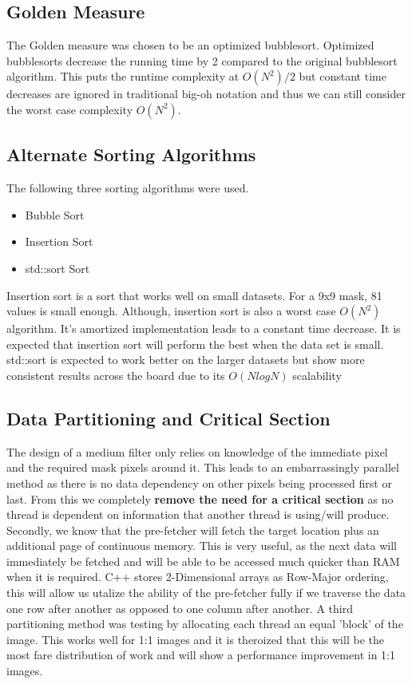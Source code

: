 \subsection{Golden Measure}
The Golden measure was chosen to be an optimized bubblesort. Optimized bubblesorts decrease the running time by 2 compared to the original bubblesort algorithm. This puts the runtime complexity at $O(N^2)/2$ but constant time decreases are ignored in traditional big-oh notation and thus we can still consider the worst case complexity $O(N^2)$.\\


\subsection{Alternate Sorting Algorithms}
The following three sorting algorithms were used.

\begin{itemize}
\item Bubble Sort
\item Insertion Sort
\item std::sort Sort
\end{itemize}

Insertion sort is a sort that works well on small datasets. For a 9x9 mask, 81 values is small enough. Although, insertion sort is also a worst case $O(N^2)$ algorithm. It's amortized implementation leads to a constant time decrease. It is expected that insertion sort will perform the best when the data set is small.\newline
std::sort is expected to work better on the larger datasets but show more consistent results across the board due to its $O(NlogN)$ scalability

\subsection{Data Partitioning and Critical Section}
The design of a medium filter only relies on knowledge of the immediate pixel and the required mask pixels around it. This leads to an embarrassingly parallel method as there is no data dependency on other pixels being processed first or last. From this we completely \textbf{remove the need for a critical section} as no thread is dependent on information that another thread is using/will produce.
\newline
Secondly, we know that the pre-fetcher will fetch the target location plus an additional page of continuous memory. This is very useful, as the next data will immediately be fetched and will be able to be accessed much quicker than RAM when it is required. 
\newline
C++ stores 2-Dimensional arrays as Row-Major ordering, this will allow us utalize the ability of the pre-fetcher fully if we traverse the data one row after another as opposed to one column after another.
\newline
A third partitioning method was testing by allocating each thread an equal 'block' of the image. This works well for 1:1 images and it is theroized that this will be the most fare distribution of work and will show a performance improvement in 1:1 images.
\newline
